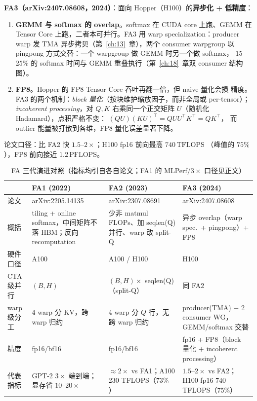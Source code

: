 \textbf{FA3（arXiv:2407.08608，2024）}：面向 Hopper（H100）的\textbf{异步化 + 低精度}：
\begin{enumerate}[itemsep=0pt,topsep=2pt]
  \item \textbf{GEMM 与 softmax 的 overlap}。softmax 在 CUDA core 上跑、GEMM 在
        Tensor Core 上跑，二者本可并行。FA3 用 warp specialization：producer warp
        发 TMA 异步拷贝（第~\ref{ch:13}~章），两个 consumer warpgroup 以
        pingpong 方式交替：一个 warpgroup 做 GEMM 时另一个做 softmax，
        $15$--$25\%$ 的 softmax 时间与 GEMM 重叠执行（第~\ref{ch:18}~章双
        consumer 结构图）。
  \item \textbf{FP8}。Hopper 的 FP8 Tensor Core 吞吐再翻一倍，但 naive 量化会损
        精度。FA3 的两个机制：\emph{block 量化}（按块维护缩放因子，而非全局或
        per-tensor）；\emph{incoherent processing}，对 $Q, K$ 右乘同一个正交矩阵
        $U$（随机化 Hadamard），点积严格不变：
        $(QU)(KU)^{\top} = QUU^{\top}K^{\top} = QK^{\top}$，
        而 outlier 能量被打散到各维，FP8 量化误差显著下降。
\end{enumerate}
论文口径：比 FA2 快 $1.5$--$2\times$；H100 fp16 前向最高 $740\,\mathrm{TFLOPS}$
（峰值的 $75\%$），FP8 前向接近 $1.2\,\mathrm{PFLOPS}$。

\begin{table}[htbp]
\centering
\caption{FA 三代演进对照（指标均引自各自论文；FA1 的 MLPerf/$3\times$ 口径见正文）}
\label{tab:15-fa-evo}
\small
\begin{tabular}{@{}p{1.5cm}p{4.1cm}p{4.6cm}p{4.9cm}@{}}
\toprule
 & FA1 (2022) & FA2 (2023) & FA3 (2024) \\
\midrule
论文 & arXiv:2205.14135 & arXiv:2307.08691 & arXiv:2407.08608 \\
概括 & tiling + online softmax，中间矩阵不落 HBM；反向 recomputation &
少非 matmul FLOPs、加 seqlen(Q) 并行、warp 改 split-Q &
异步 overlap（warp spec.\ + pingpong）+ FP8 \\
硬件口径 & A100 & A100 / H100 & H100 \\
CTA 级并行 & $(B, H)$ & $(B, H) \times$ seqlen(Q)（split-Q） & 同 FA2 \\
warp 级分工 & 4 warp 分 KV，跨 warp 归约 & 4 warp 分 $Q$ 行，无跨 warp 归约 &
producer(TMA) + 2 consumer WG，GEMM/softmax 交替 \\
精度 & fp16/bf16 & fp16/bf16 & fp16 + FP8（block 量化 + incoherent processing）\\
代表指标 & GPT-2 $3\times$ 端到端；显存省 $10$--$20\times$ &
$\approx 2\times$ vs FA1；A100 $230$ TFLOPS（$73\%$）&
$1.5$--$2\times$ vs FA2；H100 fp16 $740$ TFLOPS（$75\%$）\\
\bottomrule
\end{tabular}
\end{table}

